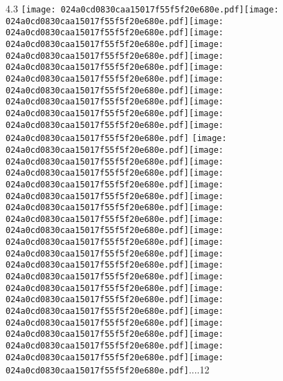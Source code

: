 \documentclass{article}
\newcommand{\origpg}[2]{\texttt{[image: 024a0cd0830caa15017f55f5f20e680e.pdf]}}
\begin{document}
{\vspace{0.385pt}\hspace{36.161pt}4.3 \origpg2{145.79pt 468.45pt 157.45pt 484.59pt}\origpg2{157.35pt 468.45pt 164.52pt 484.59pt}\hspace{-0.178pt}\origpg2{164.34pt 468.45pt 171.51pt 484.59pt}\origpg2{171.55pt 468.45pt 179.61pt 484.59pt}\origpg2{179.51pt 468.45pt 186.68pt 484.59pt}\hspace{-0.42pt}\origpg2{186.26pt 468.45pt 194.47pt 484.59pt}\origpg2{194.47pt 468.45pt 202.54pt 484.59pt}\hspace{-0.145pt}\origpg2{202.4pt 468.45pt 210.02pt 484.59pt}\hspace{-0.145pt}\origpg2{209.87pt 468.45pt 217.04pt 484.59pt}\origpg2{217.09pt 468.45pt 225.72pt 484.59pt}\origpg2{225.72pt 468.45pt 234.36pt 484.59pt}\origpg2{234.42pt 468.45pt 241.59pt 484.59pt} \origpg2{245.49pt 468.45pt 253.71pt 484.59pt}\origpg2{253.71pt 468.45pt 264.86pt 484.59pt}\hspace{-0.339pt}\origpg2{264.52pt 468.45pt 271.69pt 484.59pt}\hspace{-0.178pt}\origpg2{271.51pt 468.45pt 278.56pt 484.59pt}\hspace{-0.307pt}\origpg2{278.26pt 468.45pt 286.33pt 484.59pt}\hspace{-0.113pt}\origpg2{286.22pt 468.45pt 293.83pt 484.59pt}\hspace{0.185pt}\origpg2{294.02pt 468.45pt 310.16pt 484.59pt}\origpg2{310.16pt 468.45pt 326.3pt 484.59pt}\origpg2{326.3pt 468.45pt 342.44pt 484.59pt}\origpg2{342.44pt 468.45pt 358.58pt 484.59pt}\hspace{-0.242pt}\origpg2{358.34pt 468.45pt 374.48pt 484.59pt}\origpg2{374.48pt 468.45pt 390.62pt 484.59pt}\origpg2{390.62pt 468.45pt 406.76pt 484.59pt}\origpg2{406.76pt 468.45pt 422.9pt 484.59pt}\hspace{-0.242pt}\origpg2{422.66pt 468.45pt 438.8pt 484.59pt}\origpg2{438.8pt 468.45pt 454.94pt 484.59pt}\origpg2{454.94pt 468.45pt 471.08pt 484.59pt}\hspace{-0.242pt}\origpg2{470.84pt 468.45pt 486.98pt 484.59pt}\origpg2{486.98pt 468.45pt 503.12pt 484.59pt}\origpg2{503.12pt 468.45pt 519.26pt 484.59pt}\hspace{-0.242pt}....12 

\vspace{20.015pt}\hspace{36.161pt} 

}
\end{document}
